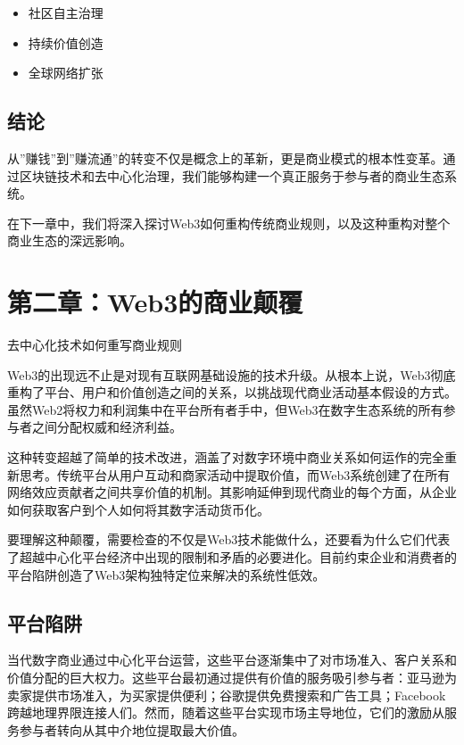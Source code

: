 \documentclass[
  Letterpaper,
]{scrbook}
\providecommand{\tightlist}{%
  \setlength{\itemsep}{0pt}\setlength{\parskip}{0pt}}
\begin{document}
\begin{itemize}
\tightlist
\item
  社区自主治理
\item
  持续价值创造
\item
  全球网络扩张
\end{itemize}

\section{结论}\label{ux7ed3ux8bba}

从''赚钱''到''赚流通''的转变不仅是概念上的革新，更是商业模式的根本性变革。通过区块链技术和去中心化治理，我们能够构建一个真正服务于参与者的商业生态系统。

在下一章中，我们将深入探讨Web3如何重构传统商业规则，以及这种重构对整个商业生态的深远影响。

\chapter{第二章：Web3的商业颠覆}\label{sec-web3-disruption}

去中心化技术如何重写商业规则

Web3的出现远不止是对现有互联网基础设施的技术升级。从根本上说，Web3彻底重构了平台、用户和价值创造之间的关系，以挑战现代商业活动基本假设的方式。虽然Web2将权力和利润集中在平台所有者手中，但Web3在数字生态系统的所有参与者之间分配权威和经济利益。

这种转变超越了简单的技术改进，涵盖了对数字环境中商业关系如何运作的完全重新思考。传统平台从用户互动和商家活动中提取价值，而Web3系统创建了在所有网络效应贡献者之间共享价值的机制。其影响延伸到现代商业的每个方面，从企业如何获取客户到个人如何将其数字活动货币化。

要理解这种颠覆，需要检查的不仅是Web3技术能做什么，还要看为什么它们代表了超越中心化平台经济中出现的限制和矛盾的必要进化。目前约束企业和消费者的平台陷阱创造了Web3架构独特定位来解决的系统性低效。

\section{平台陷阱}\label{ux5e73ux53f0ux9677ux9631}

当代数字商业通过中心化平台运营，这些平台逐渐集中了对市场准入、客户关系和价值分配的巨大权力。这些平台最初通过提供有价值的服务吸引参与者：亚马逊为卖家提供市场准入，为买家提供便利；谷歌提供免费搜索和广告工具；Facebook跨越地理界限连接人们。然而，随着这些平台实现市场主导地位，它们的激励从服务参与者转向从其中介地位提取最大价值。
\end{document}

